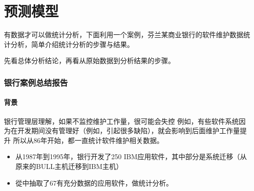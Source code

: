 \chapter{预测模型} %

有数据才可以做统计分析，下面利用一个案例，芬兰某商业银行的软件维护数据统计分析，简单介绍统计分析的步骤与结果。

先看总体分析结论，再看从原始数据到分析结果的步骤。 



\hypertarget{ux603bux7ed3ux62a5ux544a}{%
\subsection{银行案例总结报告}\label{ux603bux7ed3ux62a5ux544a}}

\hypertarget{ux80ccux666f}{%
\subsubsection{背景}\label{ux80ccux666f}}

银行管理层理解，如果不监控维护工作量，很可能会失控
例如，有些软件系统因为在开发期间没有管理好（例如，引起很多缺陷），就会影响到后面维护工作量提升
所以从86年开始，都一直统计软件维护相关数据。

\begin{itemize}
\tightlist
\item
  从1987年到1995年，银行开发了250
  IBM应用软件，其中部分是系统迁移（从原来的BULL主机迁移到IBM主机）
\item
  從中抽取了67有充分数据的应用软件，做统计分析。
\end{itemize}

